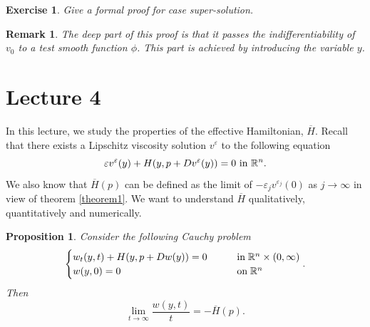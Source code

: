 \documentclass[12pt, oneside]{amsart}  	%
\newtheorem{remark}{Remark}
\newtheorem{proposition}{Proposition}
\newtheorem{exercise}{Exercise}
\begin{document}
\begin{exercise}\label{exercise3} Give a formal proof for case super-solution.
\end{exercise}


\begin{remark}
The deep part of this proof is that it passes the indifferentiability of $v_0$ to a test smooth function $\phi$. This part is achieved by introducing the variable $y$.
\end{remark}

\newpage

\section*{{\LARGE Lecture 4}}
\vspace*{0.5cm}



In this lecture, we study the properties of the effective Hamiltonian, $\overline{H}$. Recall that there exists a Lipschitz viscosity solution $v^\varepsilon$ to the following equation 
\begin{equation*}
\varepsilon v^\varepsilon(y) + H(y, p+Dv^\varepsilon(y))=0 \text{ in } \mathbb{R}^n.
\end{equation*}
We also know that $\overline{H}(p)$ can be defined as the limit of $-\varepsilon_j v^{\varepsilon_j}(0)$ as $j\longrightarrow \infty$ in view of theorem \ref{theorem1}. We want to understand $\overline{H}$ qualitatively, quantitatively and numerically.
\begin{proposition}\label{H bar as the limit large time} Consider the following Cauchy problem 
\begin{equation*}
	\begin{cases}
		w_t(y,t) + H(y, p + Dw(y))=0 \qquad&\text{in}\; \mathbb{R}^n\times (0,\infty)\\
		w(y,0) = 0 \qquad&\text{on}\;\mathbb{R}^n
	\end{cases}.
\end{equation*}
Then
	$$\lim_{t\to\infty} \frac{w(y,t)}{t}=-\overline{H}(p).$$
\end{proposition}
\end{document}
